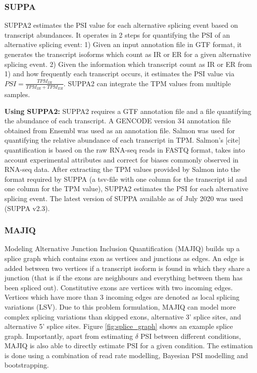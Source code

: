 \subsubsection{SUPPA}\label{subsubsec:suppa}
SUPPA2 \cite{suppa2} estimates the PSI value for each alternative splicing event based on transcript abundances. It operates in 2 steps for quantifying the PSI of an alternative splicing event:
1) Given an input annotation file in GTF format, it generates the transcript isoforms which count as IR or ER for a given alternative splicing event.
2) Given the information which transcript count as IR or ER from 1) and how frequently each transcript occurs, it estimates the PSI value via $PSI = \frac{TPM_{IR}}{TPM_{IR} + TPM_{ER}}$. SUPPA2 can integrate the TPM values from multiple samples.


\textbf{Using SUPPA2:}
SUPPA2 requires a GTF annotation file and a file quantifying the abundance of each transcript. A GENCODE version 34 annotation file obtained from Ensembl was used as an annotation file. Salmon was used for quantifying the relative abundance of each transcript in TPM. Salmon's [cite] quantification is based on the raw RNA-seq reads in FASTQ format, takes into account experimental attributes and correct for biases commonly observed in RNA-seq data. After extracting the TPM values provided by Salmon into the format required by SUPPA (a tsv-file with one column for the transcript id and one column for the TPM value), SUPPA2 estimates the PSI for each alternative splicing event.
The latest version of SUPPA available as of July 2020 was used (SUPPA v2.3). 
\subsubsection{MAJIQ}\label{subsubsec:majiq}
Modeling Alternative Junction Inclusion Quantification (MAJIQ) builds up a splice graph \cite{majiq2} which contains exon as vertices and junctions as edges. An edge is added between two vertices if a transcript isoform is found in which they share a junction (that is if the exons are neighbours and everything between them has been spliced out).
Constitutive exons are vertices with two incoming edges.
Vertices which have more than 3 incoming edges are denoted as local splicing variations (LSV). Due to this problem formulation, MAJIQ can model more complex splicing variations than skipped exons, alternative 3' splice sites, and alternative 5' splice sites. Figure \ref{fig:splice_graph} shows an example splice graph. Importantly, apart from estimating $\delta$ PSI between different conditions, MAJIQ is also able to directly estimate PSI for a given condition. The estimation is done using a combination of read rate modelling, Bayesian PSI modelling and bootstrapping.




